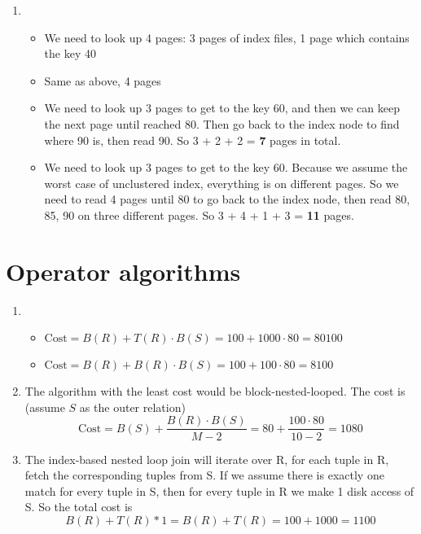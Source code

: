 \documentclass[10pt]{myland}
\begin{document}
\begin{enumerate}[label=\textbf{\arabic*.}, listparindent=0.0em, itemsep=1em]
    \item
        \begin{itemize}
            \item We need to look up 4 pages: 3 pages of index files, 1 page which contains the key 40
            \item Same as above, 4 pages
            \item We need to look up 3 pages to get to the key 60, and then we can keep the next page until reached 80.
                Then go back to the index node to find where 90 is, then read 90. So 3 + 2 + 2 = \textbf{7} pages in
                total.
            \item We need to look up 3 pages to get to the key 60. Because we assume the worst case of unclustered index,
                everything is on different pages. So we need to read 4 pages until 80 to go back to the index node, then
                read 80, 85, 90 on three different pages. So 3 + 4 + 1 + 3 = \textbf{11} pages.
        \end{itemize}
\end{enumerate}

\section{Operator algorithms}

\begin{enumerate}[label=\textbf{\arabic*.}, listparindent=0.0em, itemsep=1em]
    \item
        \begin{itemize}
            \item $\text{Cost} = B(R) + T(R)\cdot B(S) = 100 + 1000\cdot 80 = 80100$
            \item $\text{Cost} = B(R) + B(R)\cdot B(S) = 100 + 100\cdot 80 = 8100$
        \end{itemize}
    \item The algorithm with the least cost would be block-nested-looped. The cost is (assume $S$ as the outer relation)
    \[\text{Cost} = B(S) + \frac{B(R)\cdot B(S)}{M - 2} = 80 + \frac{100\cdot 80}{10 - 2} = 1080\]
    \item The index-based nested loop join will iterate over R, for each tuple in R, fetch the corresponding tuples from
    S. If we assume there is exactly one match for every tuple in S, then for every tuple in R we make 1 disk access of
    S. So the total cost is
    \[B(R) + T(R) * 1 = B(R) + T(R) = 100 + 1000 = 1100\]
\end{enumerate}
\end{document}
